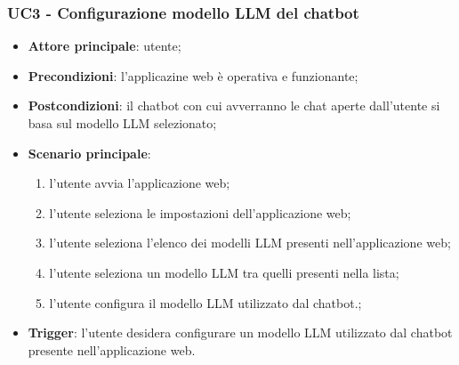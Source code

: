 \documentclass[10pt, a4paper]{article}
\begin{document}
    \subsubsection{UC3 - Configurazione modello LLM del chatbot}
    \begin{itemize}
        \item \textbf{Attore principale}: utente;
        \item \textbf{Precondizioni}: l'applicazine web è operativa e funzionante;
        \item \textbf{Postcondizioni}: il chatbot con cui avverranno le chat aperte dall'utente si basa sul modello LLM selezionato;
        \item \textbf{Scenario principale}:
            \begin{enumerate}
                \item l'utente avvia l'applicazione web;
                \item l'utente seleziona le impostazioni dell'applicazione web;
                \item l'utente seleziona l'elenco dei modelli LLM presenti nell'applicazione web;
                \item l'utente seleziona un modello LLM tra quelli presenti nella lista;
                \item l'utente configura il modello LLM utilizzato dal chatbot.;
            \end{enumerate}
        \item \textbf{Trigger}: l'utente desidera configurare un modello LLM utilizzato dal chatbot presente nell'applicazione web.
    \end{itemize}
\end{document}
